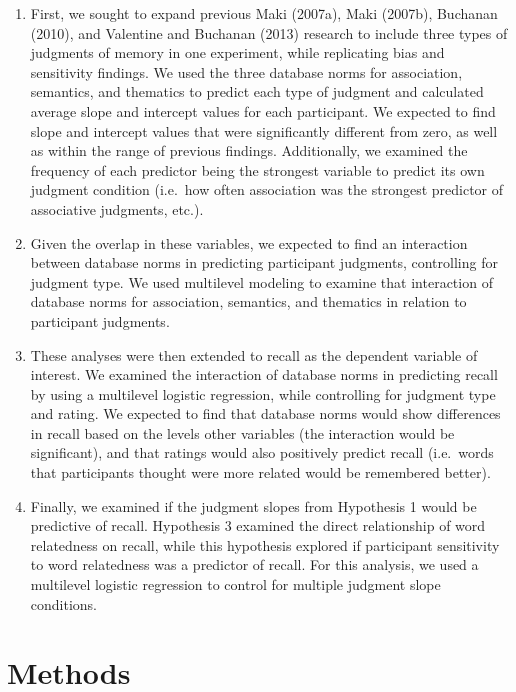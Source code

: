 \documentclass[english,man]{apa6}
\theoremstyle{definition}
\theoremstyle{definition}
\theoremstyle{definition}
\theoremstyle{remark}
\begin{document}
\begin{enumerate}
\def\labelenumi{\arabic{enumi})}
\item
  First, we sought to expand previous Maki (2007a), Maki (2007b),
  Buchanan (2010), and Valentine and Buchanan (2013) research to include
  three types of judgments of memory in one experiment, while
  replicating bias and sensitivity findings. We used the three database
  norms for association, semantics, and thematics to predict each type
  of judgment and calculated average slope and intercept values for each
  participant. We expected to find slope and intercept values that were
  significantly different from zero, as well as within the range of
  previous findings. Additionally, we examined the frequency of each
  predictor being the strongest variable to predict its own judgment
  condition (i.e.~how often association was the strongest predictor of
  associative judgments, etc.).
\item
  Given the overlap in these variables, we expected to find an
  interaction between database norms in predicting participant
  judgments, controlling for judgment type. We used multilevel modeling
  to examine that interaction of database norms for association,
  semantics, and thematics in relation to participant judgments.
\item
  These analyses were then extended to recall as the dependent variable
  of interest. We examined the interaction of database norms in
  predicting recall by using a multilevel logistic regression, while
  controlling for judgment type and rating. We expected to find that
  database norms would show differences in recall based on the levels
  other variables (the interaction would be significant), and that
  ratings would also positively predict recall (i.e.~words that
  participants thought were more related would be remembered better).
\item
  Finally, we examined if the judgment slopes from Hypothesis 1 would be
  predictive of recall. Hypothesis 3 examined the direct relationship of
  word relatedness on recall, while this hypothesis explored if
  participant sensitivity to word relatedness was a predictor of recall.
  For this analysis, we used a multilevel logistic regression to control
  for multiple judgment slope conditions.
\end{enumerate}

\section{Methods}\label{methods}
\end{document}
